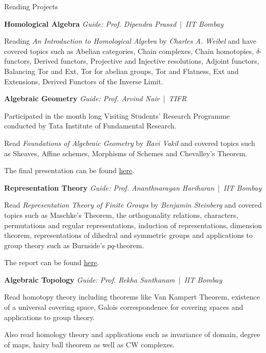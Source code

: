\begin{rubric}{Reading Projects}

\entry*[2021*] \textbf{Homological Algebra} \hfill \emph{Guide: Prof. Dipendra Prasad} \,|\, \emph{IIT Bombay}

	Reading \emph{An Introduction to Homological Algebra} by \emph{Charles A. Weibel} and have covered topics such as Abelian categories, Chain complexes, Chain homotopies, $\delta$-functors, Derived functors, Projective and Injective resolutions, Adjoint functors, Balancing Tor and Ext, Tor for abelian groups, Tor and Flatness, Ext and Extensions, Derived Functors of the Inverse Limit.

\entry*[2021] \textbf{Algebraic Geometry} \hfill \emph{Guide: Prof. Arvind Nair} \,|\, \emph{TIFR}

	Participated in the month long Visiting Students' Research Programme conducted by Tata Institute of Fundamental Research. 

	Read \emph{Foundations of Algebraic Geometry} by \emph{Ravi Vakil} and covered topics such as Sheaves, Affine schemes, Morphisms of Schemes	and Chevalley's Theorem. 

	The final presentation can be found \href{https://aryamanmaithani.github.io/math/alg-geo/}{here}.

\entry*[2021] \textbf{Representation Theory} \hfill \emph{Guide: Prof. Ananthnarayan Hariharan} \,|\, \emph{IIT Bombay}
	
	Read \emph{Representation Theory of Finite Groups} by \emph{Benjamin Steinberg} and covered topics such as Maschke's Theorem, the orthogonality relations, characters, permutations and regular representations, induction of representations, dimension theorem, representations of dihedral and symmetric groups and applications to group theory such as Burnside's $pq$-theorem. 

	The report can be found \href{https://aryamanmaithani.github.io/math/rep-theory/Notes.pdf}{here}.

\entry*[2020] \textbf{Algebraic Topology}  \hfill \emph{Guide: Prof. Rekha Santhanam} \,|\, \emph{IIT Bombay}

	Read homotopy theory including theorems like Van Kampert Theorem, existence of a universal covering space, Galois correspondence for covering spaces and applications to group theory.

	Also read homology theory and applications such as invariance of domain, degree of maps, hairy ball theorem as well as CW complexes.


\end{rubric}
